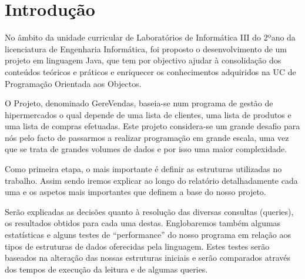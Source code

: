 \chapter{Introdução}

No âmbito da unidade curricular de Laboratórios de Informática III do 2ºano da licenciatura de Engenharia Informática, foi proposto o desenvolvimento de um projeto em linguagem Java, que tem por objectivo ajudar à consolidação dos conteúdos teóricos e práticos e enriquecer os conhecimentos adquiridos na UC de Programação Orientada aos Objectos.

O Projeto, denominado GereVendas, baseia-se num programa de gestão de hipermercados o qual depende de uma lista de clientes, uma lista de produtos e uma lista de compras efetuadas. Este projeto considera-se um grande desafio para nós pelo facto de passarmos a realizar programação em grande escala, uma vez que se trata de grandes volumes de dados e por isso uma maior complexidade.

Como primeira etapa, o mais importante é definir as estruturas utilizadas no trabalho. Assim sendo iremos explicar ao longo do relatório detalhadamente cada uma e os aspetos mais importantes que definem a base do nosso projeto.


Serão explicadas as decisões quanto à resolução das diversas consultas (queries), os resultados obtidos para cada uma destas. Englobaremos também algumas estatísticas e alguns testes de “performance” do nosso programa em relação aos tipos de estruturas de dados oferecidas pela linguagem. Estes testes serão baseados na alteração das nossas estruturas iniciais e serão comparados através dos tempos de execução da leitura e de algumas queries. 




